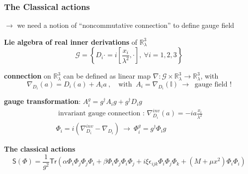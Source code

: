 \documentclass[9pt]{beamer}
\newcommand{\Ssf}{\mathsf{S}}
\begin{document}
\begin{frame}
 
\frametitle{The Classical actions} 

\vfill

$\to$  we need a notion of ``noncommutative connection'' to define gauge field

\vfill

\textbf{Lie algebra of real inner derivations} of $\mathbb{R}^3_\lambda$
\begin{equation*}
\mathcal{G} = \left\{ D_i \cdot = i \left[\frac{x_i}{\lambda^2} , \cdot \right], \ \forall i =1,2,3 \right\}
\end{equation*}

\vfill

\textbf{connection} on $\mathbb{R}^3_\lambda$ can be defined as linear map $\nabla : \mathcal{G} \times \mathbb{R}^3_\lambda \to \mathbb{R}^3_\lambda$, with
\begin{equation*}
\nabla_{D_i} (a) = D_i(a) + A_i a \ , \quad \mbox{with } \ A_i = \nabla_{D_i}(\mathbb{I}) \ \to \ \mbox{ gauge field !}
\end{equation*}

\vfill

\textbf{gauge transformation}: $A_i^g = g^\dagger A_i g + g^\dagger D_i g$ 
\vspace*{-2pt}
\begin{eqnarray*}
&\mbox{ invariant gauge connection : } \nabla_{D_i}^{inv} (a) = - i a \frac{x_i}{\lambda^2}& \\
&\Phi_i = i( \nabla^{inv}_{D_i} - \nabla_{D_i})  \ \to \ \Phi_i^g = g^\dagger \Phi_i g&
\end{eqnarray*}

\vfill

\textbf{The classical actions}
\vspace*{-6pt}
\begin{equation*}
\Ssf(\Phi) = \frac{1}{g^2} \mathsf{Tr}\left( \alpha \Phi_i\Phi_j\Phi_j\Phi_i + \beta \Phi_i\Phi_j\Phi_i\Phi_j + i \xi \epsilon_{ijk} \Phi_i\Phi_j\Phi_k + (M+\mu x^2) \Phi_i\Phi_i \right) 
\end{equation*}

\vfill
 
\end{frame}


\end{document}
